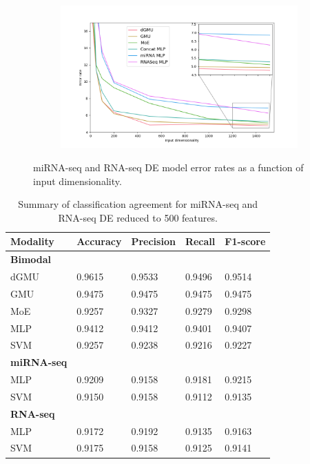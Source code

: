 \begin{figure}[H]
     \centering
     \begin{subfigure}[b]{\textwidth}
         \centering
         \includegraphics[width=\textwidth]{img/m_r/exp42.png}
     \end{subfigure}
        \caption{miRNA-seq and RNA-seq DE model error rates as a function of input dimensionality.}
        \label{fig:m_r_de_exp42}
\end{figure}

\begin{table}[H]
   \caption{Summary of classification agreement for miRNA-seq and RNA-seq DE reduced to 500 features.} 
   \label{tab:example_multicolumn}
   \small %
   \centering %
   \begin{tabular}{lllll} %
   \toprule[\heavyrulewidth]\toprule[\heavyrulewidth]
   \textbf{Modality} & \textbf{Accuracy} & \textbf{Precision} & \textbf{Recall} & \textbf{F1-score} \\ 
   \midrule
   \multicolumn{1}{l}{\textbf{Bimodal}} \\
        dGMU & 0.9615 & 0.9533 & 0.9496 & 0.9514\\
        GMU  & 0.9475 & 0.9475 & 0.9475 & 0.9475\\
        MoE   & 0.9257 & 0.9327 & 0.9279 & 0.9298\\
        MLP  & 0.9412 & 0.9412 & 0.9401 & 0.9407\\
        SVM  & 0.9257 & 0.9238 & 0.9216 & 0.9227\\
   \midrule
   \multicolumn{1}{l}{\textbf{miRNA-seq}} \\
        MLP  & 0.9209 &	0.9158 & 0.9181 & 0.9215\\
        SVM  & 0.9150 &	0.9158 & 0.9112 & 0.9135\\
   \midrule
   \multicolumn{1}{l}{\textbf{RNA-seq}}  \\
        MLP  & 0.9172 &	0.9192 & 0.9135 & 0.9163\\
        SVM  & 0.9175 &	0.9158 & 0.9125 & 0.9141\\
   \bottomrule[\heavyrulewidth] 
   \end{tabular}
   \label{table:m_r_de_exp41}
\end{table}

